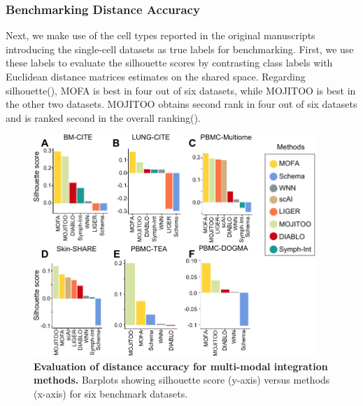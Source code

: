 \subsubsection{Benchmarking Distance Accuracy}
Next, we make use of the cell types reported in the original manuscripts introducing the single-cell datasets as true labels for benchmarking. First, we use these labels to evaluate the silhouette scores by contrasting class labels with Euclidean distance matrices estimates on the shared space. Regarding silhouette(), MOFA is best in four out of six datasets, while MOJITOO is best in the other two datasets. MOJITOO obtains second rank in four out of six datasets and is ranked second in the overall ranking(). 
\begin{figure}[!ht]
	\centering
	\includegraphics[width=0.95\textwidth]{silouette/fig}
	\vspace{0.1cm}
	\caption[Evaluation of distance accuracy for multi-modal integration methods.]{
        \textbf{Evaluation of distance accuracy for multi-modal integration methods.} Barplots showing silhouette score (y-axis) versus methods (x-axis) for six benchmark datasets. }
	\label{fig:silouette}
\end{figure}

